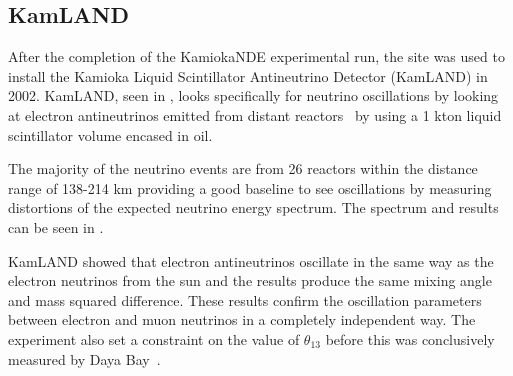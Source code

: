 \subsection{KamLAND}
After the completion of the KamiokaNDE experimental run, the site was used to install the Kamioka Liquid Scintillator Antineutrino Detector (KamLAND) in 2002. KamLAND, seen in , looks specifically for neutrino oscillations by looking at  electron antineutrinos emitted from distant reactors~\cite{46KamLAND} by using a 1 kton liquid scintillator volume encased in oil. %

The majority of the neutrino events are from 26 reactors within the distance range of 138-214 km providing a good baseline to see oscillations by measuring distortions of the expected neutrino energy spectrum. The spectrum and results can be seen in . 

KamLAND showed that electron antineutrinos oscillate in the same way as the electron neutrinos from the sun and the results produce the same mixing angle and mass squared difference. These results confirm the oscillation parameters between electron and muon neutrinos in a completely independent way. The experiment also set a constraint on the value of $\theta_{13}$ before this was conclusively measured by Daya Bay~\cite{107Gando}. %

